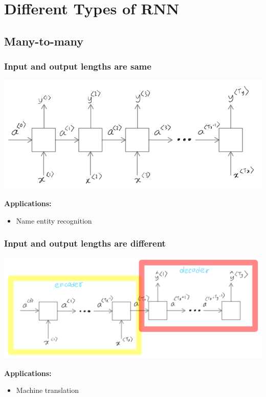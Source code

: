 \documentclass[a4paper,11pt]{article}
\renewcommand{\.}{\cdot}
\begin{document}
\section{Different Types of RNN}
\label{sec:org87c00d6}
\subsection{Many-to-many}
\label{sec:orgfa558ff}
\subsubsection{Input and output lengths are same}
\label{sec:org8d542ff}
\begin{center}
\includegraphics[width=.9\linewidth]{./img/many-to-many(same).png}
\end{center}
\textbf{Applications:}
\begin{itemize}
\item Name entity recognition
\end{itemize}
\subsubsection{Input and output lengths are different}
\label{sec:orge1de73d}
\begin{center}
\includegraphics[width=.9\linewidth]{./img/many-to-many(different).png}
\end{center}
\textbf{Applications:}
\begin{itemize}
\item Machine translation
\end{itemize}
\end{document}
